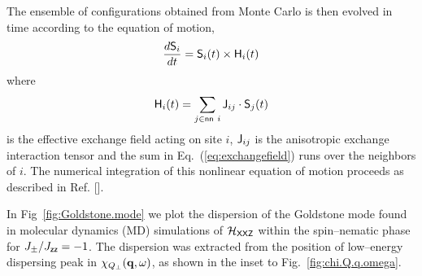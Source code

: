 \documentclass[apsrev4-1,prx,superscriptaddress,floatfix,twocolumn,longbibliography]{revtex4-1}
\begin{document}
\begin{appendix}

The ensemble of configurations obtained from Monte Carlo is then evolved in time
according to the equation of motion, 
\begin{eqnarray}
\frac{d {\sf S}_i}{dt}={\sf S}_i(t)\times {\sf H}_i(t) 
\end{eqnarray}
where
\begin{eqnarray}
{\sf H}_i(t)=\sum_{j \in {\sf nn} \ i} {\sf J}_{ij} \cdot {\sf S}_j(t)
\label{eq:exchangefield}
\end{eqnarray}
is the effective exchange field acting on site $i$, ${\sf J}_{ij}$ is the anisotropic 
exchange interaction tensor and the sum in Eq.~(\ref{eq:exchangefield})
runs over the neighbors of $i$.
%
The numerical integration of this nonlinear equation of motion proceeds
as described in Ref. 
[].


In Fig~\ref{fig:Goldstone.mode} we plot the dispersion of the Goldstone mode 
found in molecular dynamics (MD) simulations of $\mathcal{H}_{\sf XXZ}$ 
within the spin--nematic phase for $J_\pm/J_{\sf zz} = -1$.
%
The dispersion was extracted from the position of low--energy dispersing peak 
in $\chi_{Q_\perp}({\bf q},\omega)$, as shown in the inset to Fig.~\ref{fig:chi.Q.q.omega}.

\end{appendix}




\end{document}
